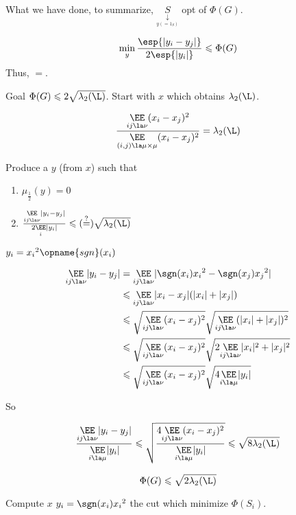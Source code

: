 \documentclass[12pt]{article}
\begin{document}
What we have done, to summarize, $\underset{\underset{y(=1_S)}{\downarrow}}{S}$ opt of $\Phi(G)$.

\[
    \min\limits_y \frac{\esp{\lvert y_i-y_j\rvert}}{2\esp{\lvert y_i \rvert}} \leqslant \Phi(G)
\]
Thus, $=$.

Goal $\Phi(G) \leqslant 2\sqrt{\lambda_2(\L)}$. Start with $x$ which obtains $\lambda_2(\L)$.

\[
    \frac{\underset{ij\la \nu}{\EE}(x_i-x_j)^2}{\underset{(i,j)\la\mu\times\mu}{\EE}(x_i-x_j)^2} = \lambda_2(\L)
\]

Produce a $y$ (from $x$) such that
\begin{enumerate}[(1)]
    \item $\mu_{\frac{1}{2}}(y) = 0$
    \item $\frac{\underset{ij\la\nu}{\EE}\lvert y_i-y_j\rvert}{2\underset{i}{\EE}\lvert y_i \rvert} \leqslant (\overset{?}{=}) \sqrt{\lambda_2(\L)}$
\end{enumerate}

$y_i = {x_i}^2 \opname{sgn}(x_i)$

\[
    \begin{aligned}
        \underset{ij\la\nu}{\EE} \lvert y_i - y_j \rvert &= \underset{ij \la \nu}{\EE} \lvert \sgn(x_i){x_i}^2 - \sgn(x_j){x_j}^2\rvert\\
        &\leqslant \underset{ij\la \nu}{\EE} \lvert x_i-x_j \rvert(\lvert x_i \rvert + \lvert x_j \rvert)\\
        &\leqslant \sqrt{\underset{ij\la\nu}{\EE}(x_i-x_j)^2} \sqrt{\underset{ij\la \nu}{\EE} (\lvert x_i \rvert + \lvert x_j \rvert)^2}\\
        &\leqslant \sqrt{\underset{ij\la\nu}{\EE}(x_i-x_j)^2} \sqrt{2\underset{ij\la \nu}{\EE} \lvert x_i \rvert^2 + \lvert x_j \rvert^2}\\
        &\leqslant \sqrt{\underset{ij\la\nu}{\EE}(x_i-x_j)^2} \sqrt{4\underset{i\la \mu}{\EE} \lvert y_i \rvert}
    \end{aligned}
\]


So

\[
    \frac{\underset{ij\la\nu}{\EE}\lvert y_i-y_j \rvert}{\underset{i\la\mu}{\EE}\lvert y_i \rvert} \leqslant \sqrt{\frac{4 \underset{ij\la\nu}{\EE}(x_i-x_j)^2}{\underset{i\la\mu}{\EE}\lvert y_i \rvert}} \leqslant\sqrt{8\lambda_2(\L)}
\]

\[
    \Phi(G) \leqslant \sqrt{2\lambda_2(\L)}
\]

\begin{algorithm}[!ht]
    \DontPrintSemicolon
    Compute $x$\;
    $y_i = \sgn(x_i){x_i}^2$\;
    \Return the cut which minimize $\Phi(S_i)$.
\end{algorithm}
\end{document}
